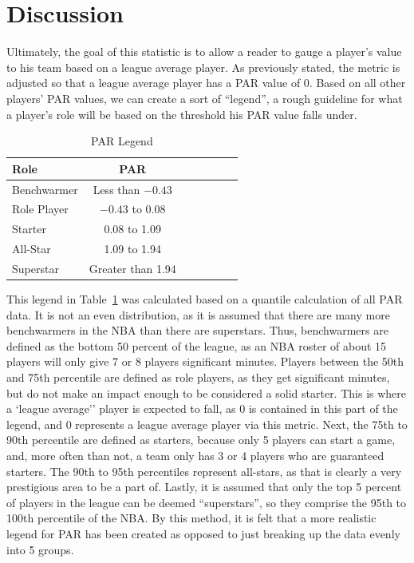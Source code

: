 \documentclass[12pt]{article}
\begin{document}
\section{Discussion}
Ultimately, the goal of this statistic is to allow a reader to gauge a player's 
value to his team based on a 
league average player. As previously stated, the metric is adjusted so that 
a league average player has a 
PAR value of 0. Based on all other players' PAR values, we can create a 
sort of ``legend'', a rough guideline 
for what a player's role will be based on the threshold his PAR value falls 
under.

\begin{table}[H]
  \caption{PAR Legend}
  \label{tab:PARLegend}
\centering
\begin{tabular}[t]{lcccccc}
  \toprule
  Role &  PAR\\
  \midrule
Benchwarmer & Less than $-0.43$\\
Role Player & $-0.43$ to 0.08\\
Starter & 0.08 to 1.09\\
All-Star & 1.09 to 1.94\\
Superstar & Greater than 1.94\\
  \bottomrule
\end{tabular}
\end{table}

This legend in Table~\ref{tab:PARLegend} was calculated based on a 
quantile 
calculation of all PAR 
data. It is not an even distribution, as 
it is assumed that there are many more benchwarmers in the NBA than 
there are superstars. Thus, 
benchwarmers are defined as the bottom 50 percent of the league, as an 
NBA roster of about 15 players 
will only give 7 or 8 players significant minutes. Players between the 50th 
and 75th percentile are defined 
as role players, as they get significant minutes, but do not make an impact 
enough to be considered a solid 
starter. This is where  a `league average'' player is expected to fall, as 0 is 
contained in this part of the 
legend, and 0 represents a league average player via this metric. Next, 
the 75th to 90th percentile are 
defined as starters, because only 5 players can start a game, and, more 
often than not, a team only has 3 
or 4 players who are guaranteed starters. The 90th to 95th percentiles 
represent all-stars, as that is clearly a 
very prestigious area to be a part of. Lastly, it is assumed that only the top 
5 percent of players in the 
league can be deemed ``superstars'', so they comprise the 95th to 100th 
percentile of the NBA. By this 
method, it is felt that a more realistic legend for PAR has been created as 
opposed to just breaking up the 
data evenly into 5 groups.
\end{document}
